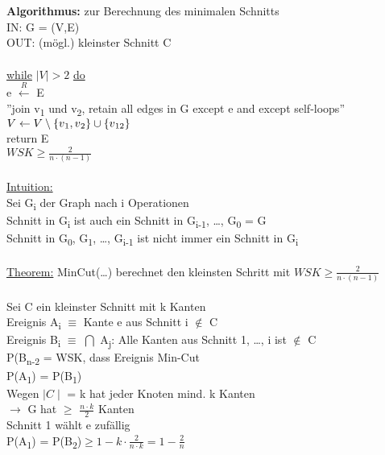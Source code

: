 \documentclass{article}
\begin{document}
 	\\
 	\\
 	\textbf{Algorithmus:} zur Berechnung des minimalen Schnitts \\
 	IN: G = (V,E) \\
 	OUT: (m\"ogl.) kleinster Schnitt C \\
 	\\
 	\underline{while} $\mid V \mid > 2$ \underline{do} \\
 	e $\stackrel{R}\leftarrow$ E \\
 	''join v\textsubscript{1} und v\textsubscript{2}, retain all edges in G except e and except self-loops'' \\
 	$V \leftarrow V\setminus \{v\textsubscript{1}, v\textsubscript{2}\} \cup \{v\textsubscript{12}\}$ \\
 	return E \\
 	$WSK \geq \frac{2}{n \cdot (n-1)}$ \\
 	\\
 	\underline{Intuition:} \\
 	Sei G\textsubscript{i} der Graph nach i Operationen \\
 	Schnitt in G\textsubscript{i} ist auch ein Schnitt in G\textsubscript{i-1}, \ldots, G\textsubscript{0} = G \\
 	Schnitt in G\textsubscript{0}, G\textsubscript{1}, \ldots, G\textsubscript{i-1} ist nicht immer ein Schnitt in G\textsubscript{i} \\
 	\\
 	\underline{Theorem:} MinCut(\ldots) berechnet den kleinsten Schritt mit $WSK \geq \frac{2}{n \cdot (n-1)}$ \\
 	\\ Sei C ein kleinster Schnitt mit k Kanten \\
 	Ereignis A\textsubscript{i} $\equiv$ Kante e aus Schnitt i $\notin$ C \\
 	Ereignis B\textsubscript{i} $\equiv$ $\bigcap$ A\textsubscript{j}: Alle Kanten aus Schnitt 1, \ldots, i ist $\notin$ C \\
 	P(B\textsubscript{n-2} = WSK, dass Ereignis Min-Cut \\
 	P(A\textsubscript{1}) = P(B\textsubscript{1}) \\
 	Wegen $\mid C \mid$ = k hat jeder Knoten mind. k Kanten \\
 	$\rightarrow$ G hat $\geq$ $\frac{n \cdot k}{2}$ Kanten \\
 	Schnitt 1 wählt e zuf\"allig \\
 	P(A\textsubscript{1}) = P(B\textsubscript{2})$\geq 1 - k \cdot \frac{2}{n \cdot k} = 1 - \frac{2}{n}$ \\
\end{document}
